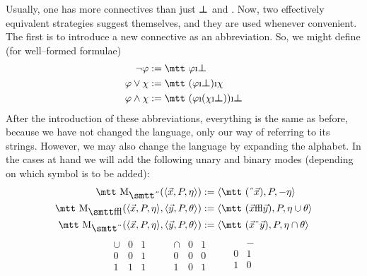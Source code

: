 Usually, one has more connectives than just $\boldsymbol{\bot}$ and 
{\mtt{}}. Now, two effectively equivalent strategies suggest 
themselves, and they are used whenever convenient. The first is to 
introduce a new connective as an abbreviation. So, we might define 
(for well--formed formulae)
\begin{align}
\nicht\varphi & := \mbox{\mtt $\varphi$\symbol{25}$\sbot$} \\
\varphi\oder\chi & := \mbox{\mtt ($\varphi$\symbol{25}$\sbot$)%
\symbol{25}$\chi$} \\
\varphi\und\chi & := \mbox{\mtt ($\varphi$\symbol{25}($\chi$%
\symbol{25}$\sbot$))\symbol{25}$\sbot$} 
\end{align}
After the introduction of these abbreviations, everything is
the same as before, because we have not changed the language,
only our way of referring to its strings. However, we may also
change the language by expanding the alphabet. In the cases at hand
we will add the following unary and binary modes (depending on which
symbol is to be added):
\begin{align}
\mbox{\mtt M}_{\mbox{\smtt\symbol{5}}}(\auf \vec{x}, P, \eta\zu) &
    := \auf \mbox{\mtt (\symbol{5}$\vec{x}$)}, P, -\eta\zu \\
\mbox{\mtt M}_{\mbox{\smtt\symbol{31}}}(\auf \vec{x}, P, \eta\zu,
    \auf \vec{y}, P, \theta\zu)
    &
    := \auf \mbox{\mtt ($\vec{x}$\symbol{31}$\vec{y}$)}, P,
    \eta \cup \theta\zu \\
\mbox{\mtt M}_{\mbox{\smtt\symbol{4}}}(\auf \vec{x}, P, \eta\zu,
    \auf \vec{y}, P, \theta\zu)
    &
    := \auf \mbox{\mtt ($\vec{x}$\symbol{4}$\vec{y}$)}, P,
    \eta \cap \theta\zu
\end{align}
\begin{equation}
\begin{array}{l|ll}
\cup & 0 & 1 \\\hline
0    & 0 & 1 \\
1    & 1 & 1
\end{array}\qquad
\begin{array}{l|ll}
\cap & 0 & 1 \\\hline
0    & 0 & 0 \\
1    & 0 & 1
\end{array}\qquad
\begin{array}{l|l}
  & - \\\hline
0 & 1 \\
1 & 0
\end{array}
\end{equation}
